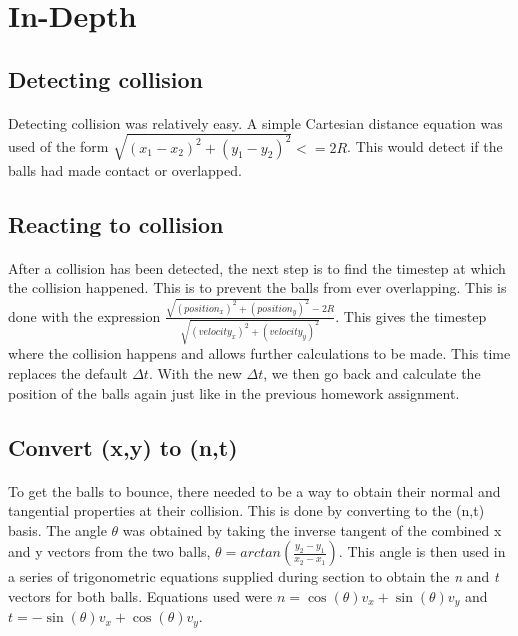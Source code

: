 \documentclass[12pt]{report}
\begin{document}
\section{In-Depth}
\subsection{Detecting collision}
\paragraph{}	Detecting collision was relatively easy. A simple Cartesian distance equation was used of the form \(\sqrt{(x_1 - x_2)^2 + (y_1 - y_2)^2} <= 2R\). This would detect if the balls had made contact or overlapped.

\subsection{Reacting to collision}
\paragraph{}	After a collision has been detected, the next step is to find the timestep at which the collision happened. This is to prevent the balls from ever overlapping. This is done with the expression \(\frac{\sqrt{(position_x)^2 + (position_y)^2} - 2R}{\sqrt{(velocity_x)^2 + (velocity_y)^2}}\). This gives the timestep where the collision happens and allows further calculations to be made. This time replaces the default \(\Delta t\). With the new \(\Delta t\), we then go back and calculate the position of the balls again just like in the previous homework assignment.

\subsection{Convert (x,y) to (n,t)}
\paragraph{}	To get the balls to bounce, there needed to be a way to obtain their normal and tangential properties at their collision. This is done by converting to the (n,t) basis. The angle \(\theta\) was obtained by taking the inverse tangent of the combined x and y vectors from the two balls, \(\theta = arctan(\frac{y_2 - y_1}{x_2 - x_1})\). This angle is then used in a series of trigonometric equations supplied during section to obtain the \textit{n} and \textit{t} vectors for both balls. Equations used were \(n = \cos(\theta)v_x + \sin(\theta)v_y\) and \(t = -\sin(\theta)v_x + \cos(\theta)v_y\).
\end{document}
